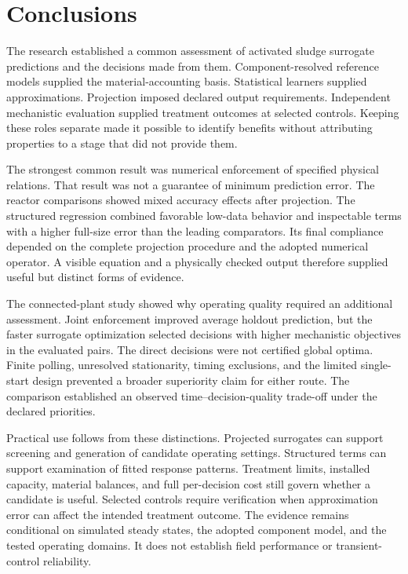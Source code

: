 \section{Conclusions}
\label{sec:assessment_conclusions}

The research established a common assessment of activated sludge surrogate predictions and the decisions made from them. Component-resolved reference models supplied the material-accounting basis. Statistical learners supplied approximations. Projection imposed declared output requirements. Independent mechanistic evaluation supplied treatment outcomes at selected controls. Keeping these roles separate made it possible to identify benefits without attributing properties to a stage that did not provide them.

The strongest common result was numerical enforcement of specified physical relations. That result was not a guarantee of minimum prediction error. The reactor comparisons showed mixed accuracy effects after projection. The structured regression combined favorable low-data behavior and inspectable terms with a higher full-size error than the leading comparators. Its final compliance depended on the complete projection procedure and the adopted numerical operator. A visible equation and a physically checked output therefore supplied useful but distinct forms of evidence.

The connected-plant study showed why operating quality required an additional assessment. Joint enforcement improved average holdout prediction, but the faster surrogate optimization selected decisions with higher mechanistic objectives in the evaluated pairs. The direct decisions were not certified global optima. Finite polling, unresolved stationarity, timing exclusions, and the limited single-start design prevented a broader superiority claim for either route. The comparison established an observed time--decision-quality trade-off under the declared priorities.

Practical use follows from these distinctions. Projected surrogates can support screening and generation of candidate operating settings. Structured terms can support examination of fitted response patterns. Treatment limits, installed capacity, material balances, and full per-decision cost still govern whether a candidate is useful. Selected controls require verification when approximation error can affect the intended treatment outcome. The evidence remains conditional on simulated steady states, the adopted component model, and the tested operating domains. It does not establish field performance or transient-control reliability.
